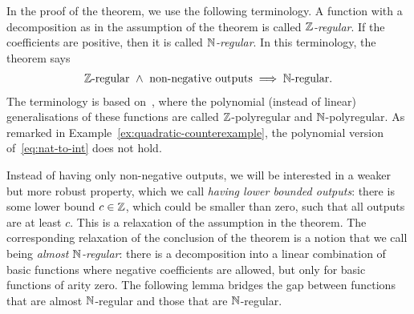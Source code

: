 In the proof of the theorem, we use the following terminology. A function with a decomposition as in the assumption of the theorem is called \emph{${\mathbb Z}$-regular}. If the coefficients are positive, then it is called \emph{${\mathbb N}$-regular}. In this terminology, the theorem says 
\begin{align}\label{eq:nat-to-int}
\text{${\mathbb Z}$-regular} \ \land \ \text{non-negative outputs} \implies \text{${\mathbb N}$-regular}.
\end{align}
The terminology is based on~\cite{Zpolyreg23}, where the polynomial (instead of linear) generalisations of these functions are called ${\mathbb Z}$-polyregular and ${\mathbb N}$-polyregular. As remarked in Example~\ref{ex:quadratic-counterexample}, the polynomial version of~\eqref{eq:nat-to-int} does not hold.

Instead of having only non-negative outputs, we will be interested in a weaker but more robust property, which we call \emph{having lower bounded outputs}: there is some lower bound $c \in {\mathbb Z}$, which could be smaller than zero, such that all outputs are at least $c$. This is a relaxation of the assumption in the theorem. The corresponding relaxation of the conclusion of the theorem is a notion that we call being \emph{almost ${\mathbb N}$-regular}: there is a decomposition into a linear combination of  basic functions where negative coefficients are allowed, but only for basic functions of arity zero. 
The following lemma bridges the gap between functions that are almost ${\mathbb N}$-regular and those that are ${\mathbb N}$-regular.






